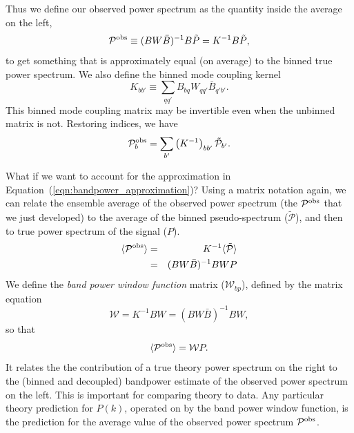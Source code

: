 Thus we define our observed power spectrum as the quantity inside the average on the left,
\begin{equation}
{\mathcal P^{\rm obs}} \equiv ( B W {\bar B})^{-1} B \tilde P = K^{-1} B \tilde P,
\end{equation}
to get something that is approximately equal (on average) to the binned true power spectrum.  We also define the binned  mode coupling kernel
\begin{equation}
  K_{bb'} \equiv \sum_{qq'}  B_{bq} W_{qq'} \bar B_{q'b'}.
\end{equation}
This binned mode coupling matrix may be invertible even when the unbinned matrix is not.
Restoring indices, we have 
\begin{equation}
  {\mathcal P}^{\rm obs}_b = \sum_{b'} \left( K^{-1} \right)_{bb'} \tilde {\mathcal P}_{b'} .
\end{equation}

What if we want to account for the approximation in Equation~(\ref{eqn:bandpower_approximation})?  
Using a matrix notation again, we can relate the ensemble average of the observed power spectrum (the ${\mathcal P}^{\rm obs}$ that we just developed) to the average of the binned pseudo-spectrum ($\tilde {\mathcal P}$), and then to true power spectrum of the signal ($P$).
\begin{eqnarray}
  \langle \mathcal{P}^{\rm obs} \rangle &=& K^{-1} \langle \tilde {\mathcal P} \rangle \\ \nonumber
  &=&  (B W \bar B)^{-1} B W P 
\end{eqnarray}
We define the \textit{band power window function} matrix (${\mathcal W}_{bp}$), defined by the matrix equation
\begin{equation}
  {\mathcal W} = K^{-1} B W = (B W \bar B)^{-1} B W,
\end{equation}
 so that
\begin{equation}
  \langle {\mathcal P}^{\rm obs} \rangle = {\mathcal W} P.
\end{equation}
It relates the the contribution of a true theory power spectrum on the right to the (binned and decoupled) bandpower estimate of the observed power spectrum on the left.  This is important for comparing theory to data.  Any particular theory prediction for $P(k)$, operated on by the band power window function, is the prediction for the average value of the observed power spectrum ${\mathcal P}^{\rm obs}$.


